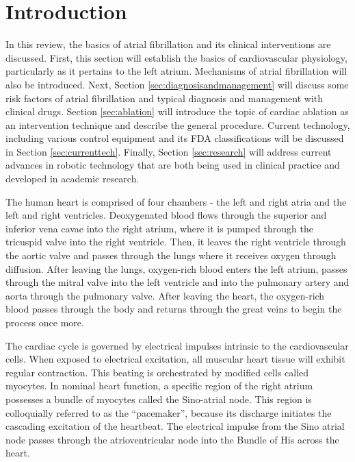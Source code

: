 \documentclass[letterpaper,10pt,conference]{ieeeconf}   %
\begin{document}
\section{Introduction}
\label{sec:intro}

In this review, the basics of atrial fibrillation and its clinical interventions are discussed. First, this section will establish the basics of cardiovascular physiology, particularly as it pertains to the left atrium. Mechanisms of atrial fibrillation will also be introduced. Next, Section \ref{sec:diagnosisandmanagement} will discuss some risk factors of atrial fibrillation and typical diagnosis and management with clinical drugs. Section \ref{sec:ablation} will introduce the topic of cardiac ablation as an intervention technique and describe the general procedure. Current technology, including various control equipment and its FDA classifications will be discussed in Section \ref{sec:currenttech}. Finally, Section \ref{sec:research} will address current advances in robotic technology that are both being used in clinical practice and developed in academic research.

The human heart is comprised of four chambers - the left and right atria and the left and right ventricles. Deoxygenated blood flows through the superior and inferior vena cavae into the right atrium, where it is pumped through the tricuspid valve into the right ventricle. Then, it leaves the right ventricle through the aortic valve and passes through the lungs where it receives oxygen through diffusion. After leaving the lungs, oxygen-rich blood enters the left atrium, passes through the mitral valve into the left ventricle and into the pulmonary artery and aorta through the pulmonary valve. After leaving the heart, the oxygen-rich blood passes through the body and returns through the great veins to begin the process once more. 

The cardiac cycle is governed by electrical impulses intrinsic to the cardiovascular cells. When exposed to electrical excitation, all muscular heart tissue will exhibit regular contraction. This beating is orchestrated by modified cells called myocytes. In nominal heart function, a specific region of the right atrium possesses a bundle of myocytes called the Sino-atrial node. This region is colloquially referred to as the ``pacemaker'', because its discharge initiates the cascading excitation of the heartbeat. The electrical impulse from the Sino atrial node passes through the atrioventricular node into the Bundle of His across the heart. 
\end{document}
